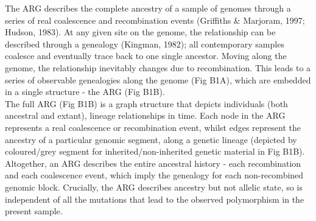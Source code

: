 \documentclass[twocolumn]{bmcart}%
\begin{document}
\begin{tcolorbox}[
  colback=blue!5!white,width=\columnwidth,colframe=blue!50!black,title= Box 1: Ancestral Recombination Graph (ARG)]
\footnotesize{The ARG describes the complete ancestry of a sample of genomes through a series of real coalescence and recombination events (Griffiths \& Marjoram, 1997; Hudson, 1983). At any given site on the genome, the relationship can be described through a genealogy (Kingman, 1982); all contemporary samples coalesce and eventually trace back to one single ancestor. Moving along the genome, the relationship inevitably changes due to recombination. This leads to a series of observable genealogies along the genome (Fig B1A), which are embedded in a single structure - the ARG (Fig B1B). \\

The full ARG (Fig B1B) is a graph structure that depicts individuals (both ancestral and extant), lineage relationships in time. Each node in the ARG represents a real coalescence or recombination event, whilst edges represent the ancestry of a particular genomic segment, along a genetic lineage (depicted by coloured/grey segment for inherited/non-inherited genetic material in Fig B1B). Altogether, an ARG describes the entire ancestral history - each recombination and each coalescence event, which imply the genealogy for each non-recombined genomic block. Crucially, the ARG describes ancestry but not allelic state, so is independent of all the mutations that lead to the observed polymorphism in the present sample.} \\


\end{tcolorbox}
\end{document}
